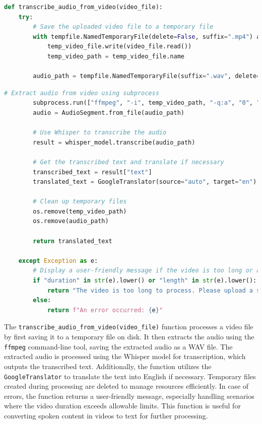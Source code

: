\begin{tcolorbox}[colback=gray!5!white, colframe=gray!80!black, boxrule=0.5pt, title=Transcribe Audio from Video]
    \begin{lstlisting}[language=Python]
def transcribe_audio_from_video(video_file):
    try:
        # Save the uploaded video file to a temporary file
        with tempfile.NamedTemporaryFile(delete=False, suffix=".mp4") as temp_video_file:
            temp_video_file.write(video_file.read())
            temp_video_path = temp_video_file.name

        audio_path = tempfile.NamedTemporaryFile(suffix=".wav", delete=False).name
    \end{lstlisting}
\end{tcolorbox}
\begin{tcolorbox}[colback=gray!5!white, colframe=gray!80!black, boxrule=0.5pt, title=Transcribe Audio from Video]
    \begin{lstlisting}[language=Python]
        # Extract audio from video using subprocess
        subprocess.run(["ffmpeg", "-i", temp_video_path, "-q:a", "0", "-map", "a", audio_path, "-y"])
        audio = AudioSegment.from_file(audio_path)

        # Use Whisper to transcribe the audio
        result = whisper_model.transcribe(audio_path)

        # Get the transcribed text and translate if necessary
        transcribed_text = result["text"]
        translated_text = GoogleTranslator(source="auto", target="en").translate(transcribed_text)

        # Clean up temporary files
        os.remove(temp_video_path)
        os.remove(audio_path)

        return translated_text

    except Exception as e:
        # Display a user-friendly message if the video is too long or another error occurs
        if "duration" in str(e).lower() or "length" in str(e).lower():
            return "The video is too long to process. Please upload a shorter video."
        else:
            return f"An error occurred: {e}"
    \end{lstlisting}
\end{tcolorbox}

\noindent
The \texttt{transcribe\_audio\_from\_video(video\_file)} function processes a video file by first saving it to a temporary file on disk. It then extracts the audio using the \texttt{ffmpeg} command-line tool, saving the extracted audio as a WAV file. The extracted audio is processed using the Whisper model for transcription, which outputs the transcribed text. Additionally, the function utilizes the \texttt{GoogleTranslator} to translate the text into English if necessary. Temporary files created during processing are deleted to manage resources efficiently. In case of errors, the function returns a user-friendly message, especially handling scenarios where the video duration exceeds allowable limits. This function is useful for converting spoken content in videos to text for further processing.



